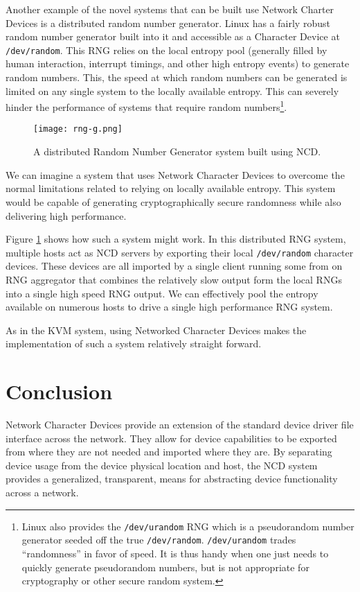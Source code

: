 \documentclass[11pt,twocolumn]{article}
\begin{document}
Another example of the novel systems that can be built use Network
Charter Devices is a distributed random number generator. Linux has a
fairly robust random number generator built into it and accessible as
a Character Device at \texttt{/dev/random}. This RNG relies on the
local entropy pool (generally filled by human interaction, interrupt
timings, and other high entropy events) to generate random
numbers. This, the speed at which random numbers can be generated is
limited on any single system to the locally available
entropy. This can severely hinder the
performance of systems that require random numbers\footnote{Linux also
provides the \texttt{/dev/urandom} RNG which is a pseudorandom number
generator seeded off the true
\texttt{/dev/random}. \texttt{/dev/urandom} trades ``randomness'' in
favor of speed. It is thus handy when one just needs to quickly
generate pseudorandom numbers, but is not appropriate for cryptography or
other secure random system.}.

\begin{figure}[h]
  \centering
  \texttt{[image: rng-g.png]}
  \caption{A distributed Random Number Generator system built using NCD.}
  \label{fig:rng}
\end{figure}

We can imagine a system that uses Network Character Devices to overcome
the normal limitations related to relying on locally available entropy. This
system would be capable of generating cryptographically secure
randomness while also delivering high performance.

Figure \ref{fig:rng} shows how such a system might work. In this
distributed RNG system, multiple hosts act as NCD servers by exporting
their local \texttt{/dev/random} character devices. These devices are
all imported by a single client running some from on RNG aggregator
that combines the relatively slow output form the local RNGs into a
single high speed RNG output. We can effectively pool the entropy
available on numerous hosts to drive a single high performance RNG
system.

As in the KVM system, using Networked Character Devices makes the
implementation of such a system relatively straight forward.

\section{Conclusion}
\label{sec:conclusion}

Network Character Devices provide an extension of the standard device
driver file interface across the network. They allow for device
capabilities to be exported from where they are not needed and imported
where they are. By separating device usage from the device physical
location and host, the NCD system provides a generalized, transparent,
means for abstracting device functionality across a network.
\end{document}
